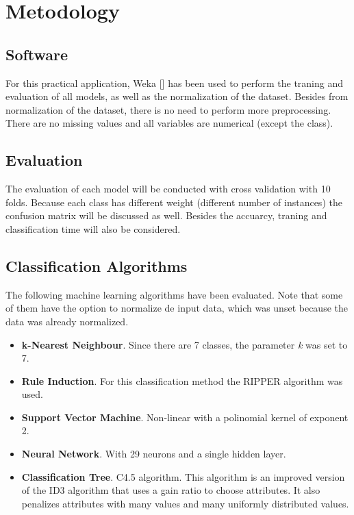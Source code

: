 \documentclass[a4paper,11pt]{article}
\begin{document}
\section{Metodology}
\label{sec:metodology}

\subsection{Software}
\label{subsec:software}

For this practical application, Weka [] has been used to perform the traning and evaluation of all models, as well as the normalization of the dataset. Besides from normalization of the dataset, there is no need to perform more preprocessing. There are no missing values and all variables are numerical (except the class).

\subsection{Evaluation}
\label{subsec:evaluation}

The evaluation of each model will be conducted with cross validation with 10 folds. Because each class has different weight (different number of instances) the confusion matrix will be discussed as well. Besides the accuarcy, traning and classification time will also be considered.

\subsection{Classification Algorithms}
\label{subsec:algorithms}

The following machine learning algorithms have been evaluated. Note that some of them have the option to normalize de input data, which was unset because the data was already normalized.

\begin{itemize}
\item \textbf{k-Nearest Neighbour}. Since there are 7 classes, the parameter \textit{k} was set to 7.
\item \textbf{Rule Induction}. For this classification method the RIPPER algorithm was used.
\item \textbf{Support Vector Machine}. Non-linear with a polinomial kernel of exponent 2.
\item \textbf{Neural Network}. With 29 neurons and a single hidden layer.
\item \textbf{Classification Tree}. C4.5 algorithm. This algorithm is an improved version of the ID3 algorithm that uses a gain ratio to choose attributes. It also penalizes attributes with many values and many uniformly distributed values.
\end{itemize}
\end{document}
